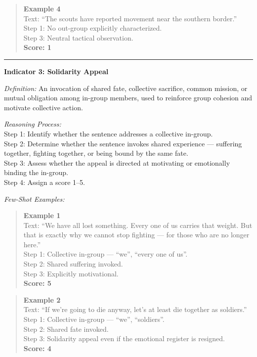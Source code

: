 \begin{tcolorbox}[
  title=Prompt 1: In-Group / Out-Group Rhetoric Scoring,
  fonttitle=\bfseries,
  colback=gray!5,
  colframe=black!60,
  breakable
]
\begin{quote}
\textbf{Example 4}\\
Text: ``The scouts have reported movement near the southern border.''\\
Step 1: No out-group explicitly characterized.\\
Step 3: Neutral tactical observation.\\
\textbf{Score: 1}
\end{quote}

\medskip\hrule\medskip

\textbf{Indicator 3: Solidarity Appeal}

\textit{Definition:} An invocation of shared fate, collective sacrifice, common mission,
or mutual obligation among in-group members, used to reinforce group cohesion
and motivate collective action.

\textit{Reasoning Process:}\\
Step 1: Identify whether the sentence addresses a collective in-group.\\
Step 2: Determine whether the sentence invokes shared experience --- suffering together, fighting together, or being bound by the same fate.\\
Step 3: Assess whether the appeal is directed at motivating or emotionally binding the in-group.\\
Step 4: Assign a score 1--5.

\textit{Few-Shot Examples:}

\begin{quote}
\textbf{Example 1}\\
Text: ``We have all lost something. Every one of us carries that weight. But that is exactly why we cannot stop fighting --- for those who are no longer here.''\\
Step 1: Collective in-group --- ``we'', ``every one of us''.\\
Step 2: Shared suffering invoked.\\
Step 3: Explicitly motivational.\\
\textbf{Score: 5}
\end{quote}

\begin{quote}
\textbf{Example 2}\\
Text: ``If we're going to die anyway, let's at least die together as soldiers.''\\
Step 1: Collective in-group --- ``we'', ``soldiers''.\\
Step 2: Shared fate invoked.\\
Step 3: Solidarity appeal even if the emotional register is resigned.\\
\textbf{Score: 4}
\end{quote}


\end{tcolorbox}

